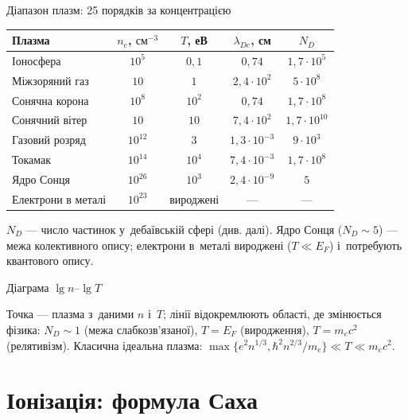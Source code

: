 \documentclass[]{beamer}
\newcommand{\figp}[1]{{\footnotesize}}
\newcommand{\cm}{\mathrm{см}}
\begin{document}
\begin{frame}{Діапазон плазм: 25 порядків за концентрацією}
	\begin{table}\centering\scriptsize
		\setlength{\tabcolsep}{3pt}
		\begin{tabular}{lcccc}
			\hline
			Плазма & $n_e$, $\cm^{-3}$ & $T$, еВ & $\lambda_{De}$, см & $N_D$ \\
			\hline
			Іоносфера & $10^{5}$ & $0{,}1$ & $0{,}74$ & $1{,}7\cdot10^{5}$ \\
			Міжзоряний газ & $10$ & $1$ & $2{,}4\cdot10^{2}$ & $5\cdot10^{8}$ \\
			Сонячна корона & $10^{8}$ & $10^{2}$ & $0{,}74$ & $1{,}7\cdot10^{8}$ \\
			Сонячний вітер & $10$ & $10$ & $7{,}4\cdot10^{2}$ & $1{,}7\cdot10^{10}$ \\
			Газовий розряд & $10^{12}$ & $3$ & $1{,}3\cdot10^{-3}$ & $9\cdot10^{3}$ \\
			Токамак & $10^{14}$ & $10^{4}$ & $7{,}4\cdot10^{-3}$ & $1{,}7\cdot10^{8}$ \\
			Ядро Сонця & $10^{26}$ & $10^{3}$ & $2{,}4\cdot10^{-9}$ & $5$ \\
			Електрони в металі & $10^{23}$ & вироджені & --- & --- \\
			\hline
		\end{tabular}
	\end{table}
	\begin{block}{}\justifying\small
		$N_D$ --- число частинок у~дебаївській сфері (див. далі). Ядро Сонця ($N_D\sim5$) --- межа колективного опису;
		електрони в~металі \alert{вироджені} ($T\ll E_F$) і~потребують квантового опису.
	\end{block}
\end{frame}

\begin{frame}{Діаграма $\lg n$--$\lg T$}
	\centering
	\figp{plasma_types.tikz}
	\begin{block}{}\justifying\tiny
		Точка --- плазма з~даними $n$ і~$T$; лінії відокремлюють області, де змінюється фізика: $N_D\sim1$ (межа слабкозв'язаної),
		$T=E_F$ (виродження), $T=m_ec^2$ (релятивізм). Класична ідеальна плазма: $\max\{e^2n^{1/3},\hbar^2n^{2/3}/m_e\}\ll T\ll m_ec^2$.
	\end{block}
\end{frame}

\section{Іонізація: формула Саха}
\end{document}

